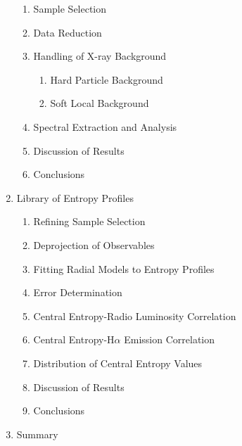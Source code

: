 \documentclass[12pt]{plan}
\begin{document}
\begin{enumerate}
\begin{enumerate}
\item Sample Selection
\item Data Reduction
\item Handling of X-ray Background
\begin{enumerate}
\item Hard Particle Background
\item Soft Local Background
\end{enumerate}
\item Spectral Extraction and Analysis
\item Discussion of Results
\item Conclusions
\end{enumerate}
\item Library of Entropy Profiles
\begin{enumerate}
\item Refining Sample Selection
\item Deprojection of Observables
\item Fitting Radial Models to Entropy Profiles
\item Error Determination
\item Central Entropy-Radio Luminosity Correlation
\item Central Entropy-H$\alpha$ Emission Correlation
\item Distribution of Central Entropy Values
\item Discussion of Results
\item Conclusions
\end{enumerate}
\item Summary
\end{enumerate}



 
\end{document}

